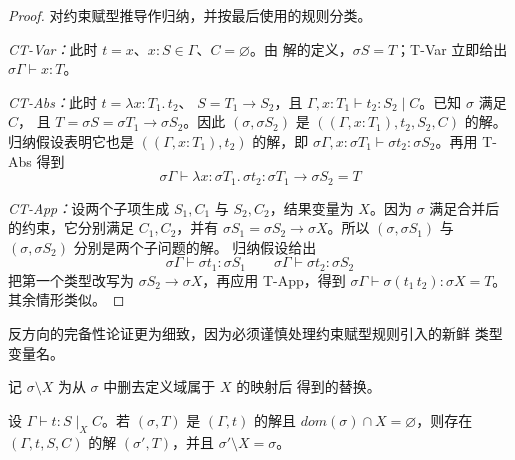 \begin{proof}
对约束赋型推导作归纳，并按最后使用的规则分类。

\emph{CT-Var：}此时 \(t=x\)、\(x:S\in\Gamma\)、\(C=\varnothing\)。由
解的定义，\(\sigma S=T\)；T-Var 立即给出
\(\sigma\Gamma\vdash x:T\)。

\emph{CT-Abs：}此时 \(t=\lambda x:T_1.\,t_2\)、
\(S=T_1\to S_2\)，且
\(\Gamma,x:T_1\vdash t_2:S_2\mid C\)。已知 \(\sigma\) 满足 \(C\)，
且 \(T=\sigma S=\sigma T_1\to\sigma S_2\)。因此
\((\sigma,\sigma S_2)\) 是
\(((\Gamma,x:T_1),t_2,S_2,C)\) 的解。归纳假设表明它也是
\(((\Gamma,x:T_1),t_2)\) 的解，即
\(\sigma\Gamma,x:\sigma T_1\vdash\sigma t_2:\sigma S_2\)。再用 T-Abs 得到
\[
\sigma\Gamma\vdash
\lambda x:\sigma T_1.\,\sigma t_2:
\sigma T_1\to\sigma S_2=T
\]

\emph{CT-App：}设两个子项生成 \(S_1,C_1\) 与 \(S_2,C_2\)，结果变量为
\(X\)。因为 \(\sigma\) 满足合并后的约束，它分别满足 \(C_1,C_2\)，并有
\(\sigma S_1=\sigma S_2\to\sigma X\)。所以
\((\sigma,\sigma S_1)\) 与 \((\sigma,\sigma S_2)\) 分别是两个子问题的解。
归纳假设给出
\[
\sigma\Gamma\vdash\sigma t_1:\sigma S_1
\qquad
\sigma\Gamma\vdash\sigma t_2:\sigma S_2
\]
把第一个类型改写为 \(\sigma S_2\to\sigma X\)，再应用 T-App，得到
\(\sigma\Gamma\vdash\sigma(t_1\,t_2):\sigma X=T\)。其余情形类似。
\end{proof}

反方向的完备性论证更为细致，因为必须谨慎处理约束赋型规则引入的新鲜
类型变量名。

\begin{definition}
\label{def:22.3.6}
记 \(\sigma\setminus X\) 为从 \(\sigma\) 中删去定义域属于 \(X\) 的映射后
得到的替换。
\end{definition}

\begin{theorem}[约束赋型的完备性]
\label{thm:22.3.7}
设 \(\Gamma\vdash t:S\mid_X C\)。若 \((\sigma,T)\) 是
\((\Gamma,t)\) 的解且 \(dom(\sigma)\cap X=\varnothing\)，则存在
\((\Gamma,t,S,C)\) 的解 \((\sigma',T)\)，并且
\(\sigma'\setminus X=\sigma\)。
\end{theorem}

